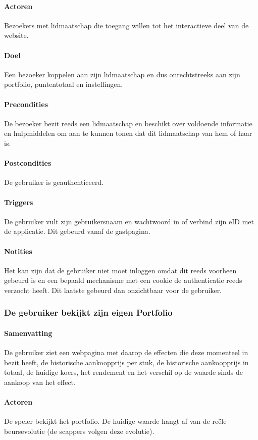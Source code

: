 \paragraph{Actoren} Bezoekers met lidmaatschap die toegang willen tot het interactieve deel van de website.
\paragraph{Doel} Een bezoeker koppelen aan zijn lidmaatschap en dus onrechtstreeks aan zijn portfolio, puntentotaal en instellingen.
\paragraph{Precondities} De bezoeker bezit reeds een lidmaatschap en beschikt over voldoende informatie en hulpmiddelen om aan te kunnen tonen dat dit lidmaatschap van hem of haar is.
\paragraph{Postcondities} De gebruiker is geauthenticeerd.
\paragraph{Triggers} De gebruiker vult zijn gebruikersnaam en wachtwoord in of verbind zijn eID met de applicatie. Dit gebeurd vanaf de gastpagina.
\paragraph{Notities} Het kan zijn dat de gebruiker niet moet inloggen omdat dit reeds voorheen gebeurd is en een bepaald mechanisme met een cookie de authenticatie reeds verzocht heeft. Dit laatste gebeurd dan onzichtbaar voor de gebruiker.


\subsubsection{De gebruiker bekijkt zijn eigen Portfolio}
\paragraph{Samenvatting} De gebruiker ziet een webpagina met daarop de effecten die deze momenteel in bezit heeft, de historische aankoopprijs per stuk, de historische aankoopprijs in totaal, de huidige koers, het rendement en het verschil op de waarde sinds de aankoop van het effect.
\paragraph{Actoren} De speler bekijkt het portfolio. De huidige waarde hangt af van de reële beursevolutie (de scappers volgen deze evolutie).
